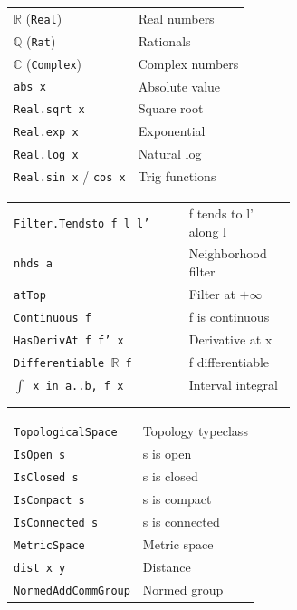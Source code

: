 \documentclass[10pt]{extarticle}
\begin{document}
\begin{multicols}{2}
\begin{tabularx}{\linewidth}{@{}l@{\enspace}Y@{}}
\texttt{$\mathbb{R}$} (\texttt{Real}) & Real numbers \\
\texttt{$\mathbb{Q}$} (\texttt{Rat}) & Rationals \\
\texttt{$\mathbb{C}$} (\texttt{Complex}) & Complex numbers \\
\texttt{abs x}                       & Absolute value \\
\texttt{Real.sqrt x}                 & Square root \\
\texttt{Real.exp x}                  & Exponential \\
\texttt{Real.log x}                  & Natural log \\
\texttt{Real.sin x} / \texttt{cos x} & Trig functions \\
\end{tabularx}

\begin{tabularx}{\linewidth}{@{}>{\raggedright\arraybackslash}p{0.62\linewidth}@{\enspace}Y@{}}
\texttt{Filter.Tendsto f l l'}    & f tends to l' along l \\
\texttt{nhds a}                    & Neighborhood filter \\
\texttt{atTop}                     & Filter at $+\infty$ \\
\texttt{Continuous f}              & f is continuous \\
\texttt{HasDerivAt f f' x}        & Derivative at x \\
\texttt{Differentiable $\mathbb{R}$ f}  & f differentiable \\
\texttt{$\int$ x in a..b, f x}   & Interval integral \\
 & \\
 \\
\end{tabularx}

\begin{tabularx}{\linewidth}{@{}l@{\enspace}Y@{}}
\texttt{TopologicalSpace}     & Topology typeclass \\
\texttt{IsOpen s}              & s is open \\
\texttt{IsClosed s}            & s is closed \\
\texttt{IsCompact s}           & s is compact \\
\texttt{IsConnected s}         & s is connected \\
\texttt{MetricSpace}           & Metric space \\
\texttt{dist x y}              & Distance \\
\texttt{NormedAddCommGroup}    & Normed group \\
\end{tabularx}


\end{multicols}
\end{document}
